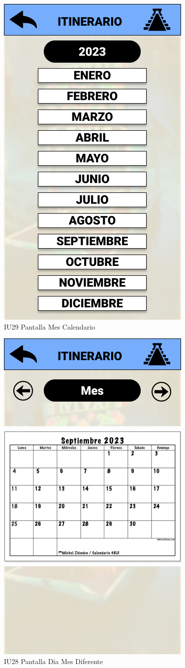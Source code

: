 \begin{figure}[htbp]
    \centering 
        \includegraphics[width=.5\linewidth]{Pantallas Prototipo3/IU29 Pantalla Mes Calendario.jpg}
        \caption{IU29 Pantalla Mes Calendario}
\end{figure}

\begin{figure}[htbp]
        \centering
        \includegraphics[width=.7\linewidth]{Pantallas Prototipo3/IU28 Pantalla Dia Mes Diferente.jpg}
        \caption{IU28 Pantalla Dia Mes Diferente}
        \label{fig:enter-label}
\end{figure}

